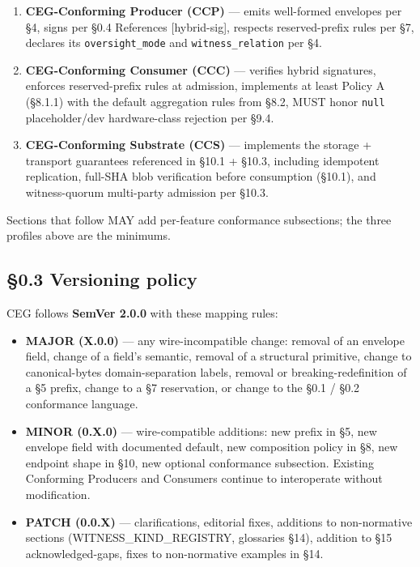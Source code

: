\documentclass[11pt]{article}
\begin{document}
\begin{enumerate}\setlength\itemsep{0pt}
\item \textbf{CEG-Conforming Producer (CCP)} — emits well-formed envelopes per §4, signs per §0.4 References [hybrid-sig], respects reserved-prefix rules per §7, declares its \texttt{oversight\_mode} and \texttt{witness\_relation} per §4.
\item \textbf{CEG-Conforming Consumer (CCC)} — verifies hybrid signatures, enforces reserved-prefix rules at admission, implements at least Policy A (§8.1.1) with the default aggregation rules from §8.2, MUST honor \texttt{null} placeholder/dev hardware-class rejection per §9.4.
\item \textbf{CEG-Conforming Substrate (CCS)} — implements the storage + transport guarantees referenced in §10.1 + §10.3, including idempotent replication, full-SHA blob verification before consumption (§10.1), and witness-quorum multi-party admission per §10.3.
\end{enumerate}


Sections that follow MAY add per-feature conformance subsections; the three profiles above are the minimums.



\subsection*{§0.3 Versioning policy}


CEG follows \textbf{SemVer 2.0.0} with these mapping rules:


\begin{itemize}\setlength\itemsep{0pt}
\item \textbf{MAJOR (X.0.0)} — any wire-incompatible change: removal of an envelope field, change of a field's semantic, removal of a structural primitive, change to canonical-bytes domain-separation labels, removal or breaking-redefinition of a §5 prefix, change to a §7 reservation, or change to the §0.1 / §0.2 conformance language.
\item \textbf{MINOR (0.X.0)} — wire-compatible additions: new prefix in §5, new envelope field with documented default, new composition policy in §8, new endpoint shape in §10, new optional conformance subsection. Existing Conforming Producers and Consumers continue to interoperate without modification.
\item \textbf{PATCH (0.0.X)} — clarifications, editorial fixes, additions to non-normative sections (WITNESS\_KIND\_REGISTRY, glossaries §14), addition to §15 acknowledged-gaps, fixes to non-normative examples in §14.
\end{itemize}
\end{document}
